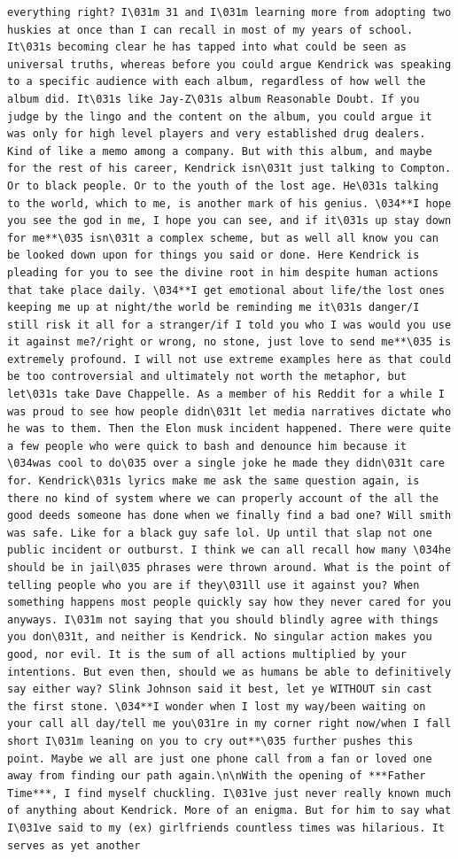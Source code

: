 \documentclass[
  letterpaper,
  DIV=11,
  numbers=noendperiod]{scrreprt}
\begin{document}
\begin{verbatim}
everything right? I\031m 31 and I\031m learning more from adopting two huskies at once than I can recall in most of my years of school. It\031s becoming clear he has tapped into what could be seen as universal truths, whereas before you could argue Kendrick was speaking to a specific audience with each album, regardless of how well the album did. It\031s like Jay-Z\031s album Reasonable Doubt. If you judge by the lingo and the content on the album, you could argue it was only for high level players and very established drug dealers. Kind of like a memo among a company. But with this album, and maybe for the rest of his career, Kendrick isn\031t just talking to Compton. Or to black people. Or to the youth of the lost age. He\031s talking to the world, which to me, is another mark of his genius. \034**I hope you see the god in me, I hope you can see, and if it\031s up stay down for me**\035 isn\031t a complex scheme, but as well all know you can be looked down upon for things you said or done. Here Kendrick is pleading for you to see the divine root in him despite human actions that take place daily. \034**I get emotional about life/the lost ones keeping me up at night/the world be reminding me it\031s danger/I still risk it all for a stranger/if I told you who I was would you use it against me?/right or wrong, no stone, just love to send me**\035 is extremely profound. I will not use extreme examples here as that could be too controversial and ultimately not worth the metaphor, but let\031s take Dave Chappelle. As a member of his Reddit for a while I was proud to see how people didn\031t let media narratives dictate who he was to them. Then the Elon musk incident happened. There were quite a few people who were quick to bash and denounce him because it \034was cool to do\035 over a single joke he made they didn\031t care for. Kendrick\031s lyrics make me ask the same question again, is there no kind of system where we can properly account of the all the good deeds someone has done when we finally find a bad one? Will smith was safe. Like for a black guy safe lol. Up until that slap not one public incident or outburst. I think we can all recall how many \034he should be in jail\035 phrases were thrown around. What is the point of telling people who you are if they\031ll use it against you? When something happens most people quickly say how they never cared for you anyways. I\031m not saying that you should blindly agree with things you don\031t, and neither is Kendrick. No singular action makes you good, nor evil. It is the sum of all actions multiplied by your intentions. But even then, should we as humans be able to definitively say either way? Slink Johnson said it best, let ye WITHOUT sin cast the first stone. \034**I wonder when I lost my way/been waiting on your call all day/tell me you\031re in my corner right now/when I fall short I\031m leaning on you to cry out**\035 further pushes this point. Maybe we all are just one phone call from a fan or loved one away from finding our path again.\n\nWith the opening of ***Father Time***, I find myself chuckling. I\031ve just never really known much of anything about Kendrick. More of an enigma. But for him to say what I\031ve said to my (ex) girlfriends countless times was hilarious. It serves as yet another 
\end{verbatim}
\end{document}
